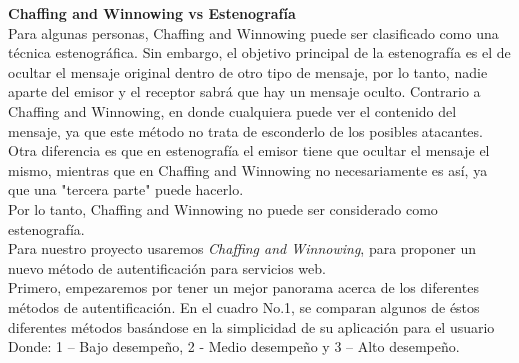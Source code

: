 \documentclass[12pt, a4paper, titlepage]{article}
\begin{document}
        \textbf{Chaffing and Winnowing vs Estenografía}\\
        
        Para algunas personas, Chaffing and Winnowing puede ser clasificado como una técnica estenográfica. Sin embargo, el objetivo principal de la estenografía es el de ocultar el mensaje original dentro de otro tipo de mensaje, por lo tanto, nadie aparte del emisor y el receptor sabrá que hay un mensaje oculto. Contrario a Chaffing and Winnowing, en donde cualquiera puede ver el contenido del mensaje, ya que este método no trata de esconderlo de los posibles atacantes.\\
        Otra diferencia es que en estenografía el emisor tiene que ocultar el mensaje el mismo, mientras que en Chaffing and Winnowing no necesariamente es así, ya que una "tercera parte" puede hacerlo.\\
        Por lo tanto, Chaffing and Winnowing no puede ser considerado como estenografía.\\
        
        Para nuestro proyecto usaremos \textit{Chaffing and Winnowing}, para proponer un nuevo método de autentificación para servicios web. \\
        
        
		
		
		Primero, empezaremos por tener un mejor panorama acerca de los diferentes métodos de autentificación. En el cuadro No.1, se comparan algunos de éstos diferentes métodos basándose en la simplicidad de su aplicación para el usuario \cite{ComparisonAuthenticationMethodsResources} Donde: 1 – Bajo desempeño, 2 - Medio desempeño y 3 – Alto desempeño.
		
\end{document}
